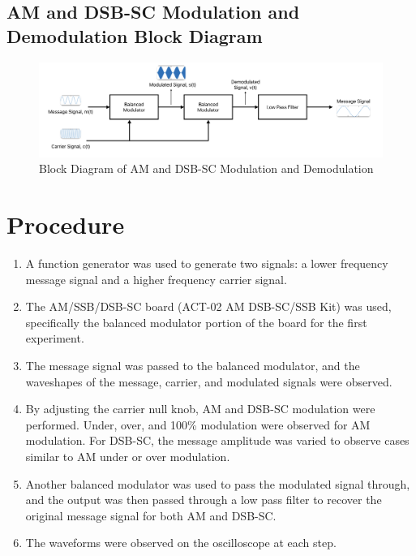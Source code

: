 \documentclass[12pt]{article}
\begin{document}
\subsection*{AM and DSB-SC Modulation and Demodulation Block Diagram}
\begin{figure}[H]
    \centering
    \includegraphics[width=\textwidth]{bmbm.png}
    \caption{Block Diagram of AM and DSB-SC Modulation and Demodulation}
    \label{fig:modulation_demodulation_block_diagram}
\end{figure}

\section*{Procedure}
\begin{enumerate}
    \item A function generator was used to generate two signals: a lower frequency message signal and a higher frequency carrier signal.
    \item The AM/SSB/DSB-SC board (ACT-02 AM DSB-SC/SSB Kit) was used, specifically the balanced modulator portion of the board for the first experiment.
    \item The message signal was passed to the balanced modulator, and the waveshapes of the message, carrier, and modulated signals were observed.
    \item By adjusting the carrier null knob, AM and DSB-SC modulation were performed. Under, over, and 100\% modulation were observed for AM modulation. For DSB-SC, the message amplitude was varied to observe cases similar to AM under or over modulation.
    \item Another balanced modulator was used to pass the modulated signal through, and the output was then passed through a low pass filter to recover the original message signal for both AM and DSB-SC.
    \item The waveforms were observed on the oscilloscope at each step.
\end{enumerate}
\end{document}
